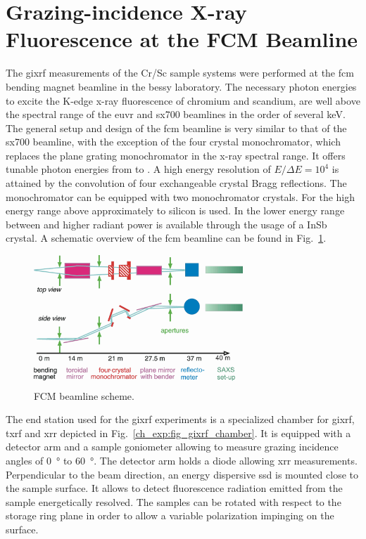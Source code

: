 \section{Grazing-incidence X-ray Fluorescence at the FCM Beamline} \label{ch_exp:sec_xrf_at_fcm}
The \gls{gixrf} measurements of the Cr/Sc sample systems were performed at the \gls{fcm} bending magnet beamline \cite{krumrey_design_1998} in the \gls{bessy} laboratory. The necessary photon energies to excite the K-edge x-ray fluorescence of chromium and scandium, are well above the spectral range of the \gls{euvr} and \gls{sx700} beamlines in the order of several \si{\kilo\electronvolt}. The general setup and design of the \gls{fcm} beamline is very similar to that of the \gls{sx700} beamline, with the exception of the four crystal monochromator, which replaces the plane grating monochromator in the x-ray spectral range. It offers tunable photon energies from  to . A high energy resolution of $E/\Delta E = 10^4$ is attained by the convolution of four exchangeable crystal Bragg reflections. The monochromator can be equipped with two monochromator crystals. For the high energy range above approximately  to  silicon is used. In the lower energy range between  and  higher radiant power is available through the usage of a InSb crystal. A schematic overview of the \gls{fcm} beamline can be found in Fig.~\ref{ch_exp:fig_fcm_scheme}.
\begin{figure}[htb]
        \includegraphics[width=0.7\textwidth]{img/FCMScheme.png}
        \caption[FCM beamline scheme.]{%
            FCM beamline scheme.}
        \label{ch_exp:fig_fcm_scheme}
\end{figure}

The end station used for the \gls{gixrf} experiments is a specialized chamber for \gls{gixrf}, \gls{txrf} and \gls{xrr} \cite{lubeck_novel_2013} depicted in Fig.~\ref{ch_exp:fig_gixrf_chamber}. It is equipped with a detector arm and a sample goniometer allowing to measure grazing incidence angles of \SI{0}{\degree} to \SI{60}{\degree}. The detector arm holds a diode allowing \gls{xrr} measurements. Perpendicular to the beam direction, an energy dispersive \gls{ssd} is mounted close to the sample surface. It allows to detect fluorescence radiation emitted from the sample energetically resolved. The samples can be rotated with respect to the storage ring plane in order to allow a variable polarization impinging on the surface.



